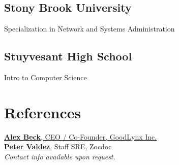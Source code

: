 \documentclass[]{plushcv}
\begin{document}
\begin{minipage}[t]{0.25\textwidth}
\subsection{Stony Brook University}
Specialization in Network and Systems Administration \\

\sectionsep
\subsection{Stuyvesant High School}
Intro to Computer Science \\
\sectionsep


\section{References}
\href{https://www.linkedin.com/in/alex-beck-07095793/}{\textbf{Alex Beck}, CEO / Co-Founder, GoodLynx Inc.}
\\
\sectionsep
\href{https://www.linkedin.com/in/peter-valdez/}{\textbf{Peter Valdez}}, Staff SRE, Zocdoc
\\
\vspace{4pt}
{\color{date}\fontspec[Path = \pathlocationfont]{\locationfont}\fontsize{8pt}{10pt}\selectfont\itshape Contact info available upon request.\normalfont}


\end{minipage} 
\end{document}
